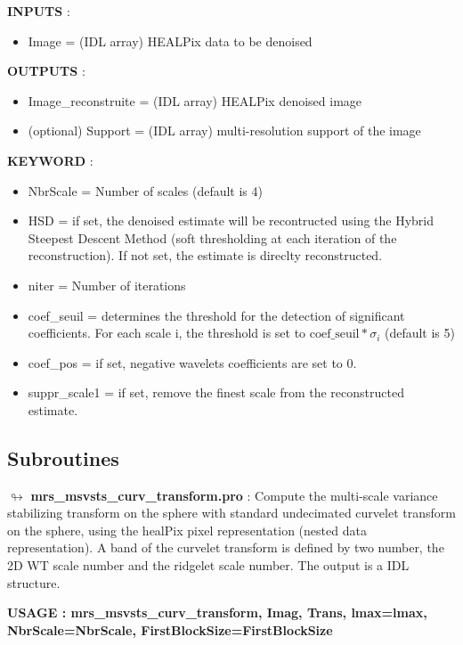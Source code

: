 \textbf{INPUTS} : 
\begin{itemize}
\item{Image = (IDL array) HEALPix data to be denoised}
\end{itemize}

\textbf{OUTPUTS} : 
\begin{itemize}
\item{Image\_reconstruite = (IDL array) HEALPix denoised image}
\item{(optional) Support = (IDL array) multi-resolution support of the image}
\end{itemize}

\textbf{KEYWORD} :

\begin{itemize}
  \item NbrScale = Number of scales (default is 4)
  \item HSD = if set, the denoised estimate will be recontructed using the Hybrid Steepest Descent Method (soft thresholding at each iteration of the reconstruction). If not set, the estimate is direclty reconstructed.
  \item niter = Number of iterations
   \item coef\_seuil = determines the threshold for the detection of significant coefficients. For each scale i, the threshold is set to $\text{coef\_seuil}*\sigma_i$ (default is 5)
  \item coef\_pos = if set, negative wavelets coefficients are set to 0.
  \item suppr\_scale1 = if set, remove the finest scale from the reconstructed estimate.
\end{itemize}

\subsection{Subroutines}
$\looparrowright$ \textbf{mrs\_msvsts\_curv\_transform.pro} : Compute the multi-scale variance stabilizing transform on the sphere with standard undecimated curvelet transform on the sphere, using the healPix pixel representation (nested data representation). A band of the curvelet transform is defined by two number, the 2D WT scale number and the ridgelet scale number. The output is a IDL structure.


\begin{center}
 \bf{USAGE : mrs\_msvsts\_curv\_transform, Imag, Trans, lmax=lmax, NbrScale=NbrScale, FirstBlockSize=FirstBlockSize}
\end{center}

